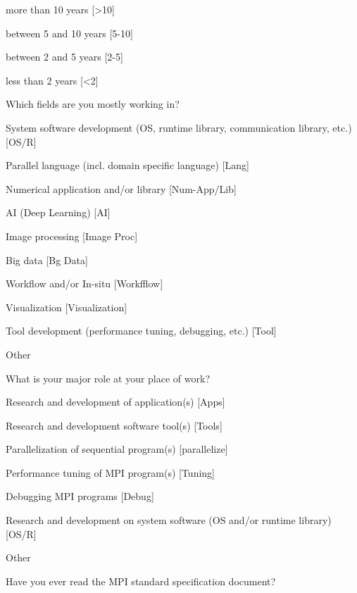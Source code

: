 \documentclass[preprint,5p,times]{elsarticle}
\begin{document}
{\begin{description}
\begin{inparaenum}[{\bf C}1)]
    \item more than 10 years [\textgreater10]
    \item between 5 and 10 years [5-10]
    \item between 2 and 5 years [2-5]
    \item less than 2 years [\textless 2]
    \end{inparaenum}
  \item[Q7*:] Which fields are you mostly working in?
    \begin{inparaenum}[{\bf C}1)]
    \item System software development (OS, runtime library, communication
      library, etc.) [OS/R]
    \item Parallel language (incl. domain specific language) [Lang]
    \item Numerical application and/or library [Num-App/Lib]
    \item AI (Deep Learning) [AI]
    \item Image processing [Image Proc]
    \item Big data [Bg Data]
    \item Workflow and/or In-situ [Workfflow]
    \item Visualization [Visualization]
    \item Tool development (performance tuning, debugging, etc.) [Tool]
    \item Other
    \end{inparaenum}
  \item[Q8*:] What is your major role at your place of work?
    \begin{inparaenum}[{\bf C}1)]
    \item Research and development of application(s) [Apps]
    \item Research and development software tool(s) [Tools]
    \item Parallelization of sequential program(s) [parallelize]
    \item Performance tuning of MPI program(s) [Tuning]
    \item Debugging MPI programs [Debug]
    \item Research and development on system software (OS and/or runtime
      library) [OS/R]
    \item Other
    \end{inparaenum}
  \item[Q9:] Have you ever read the MPI standard specification document?
    \begin{inparaenum}[{\bf C}1)]

\end{inparaenum}
\end{description}}
\end{document}
